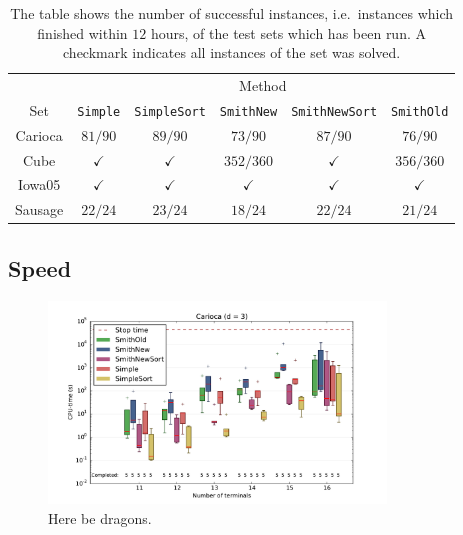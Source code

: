 \begin{table}[htbp]
  \centering
  \begin{tabular}{cccccc}
    \toprule
            & \multicolumn{5}{c}{Method}                             \\
    \cmidrule(l){2-6}
    Set     & \texttt{Simple} 
            & \texttt{SimpleSort}
            & \texttt{SmithNew} 
            & \texttt{SmithNewSort}
            & \texttt{SmithOld}                                      \\
    \cmidrule(r){1-1}\cmidrule(l){2-6}
    Carioca & $81/90$  & $89/90$  & $73/90$   & $87/90$  & $76/90$   \\
    Cube    & $\checkmark$ & $\checkmark$ & $352/360$ & $\checkmark$ & $356/360$ \\
    Iowa05  & $\checkmark$ & $\checkmark$ & $\checkmark$  & $\checkmark$ & $\checkmark$  \\
    Sausage & $22/24$  & $23/24$  & $18/24$   & $22/24$  & $21/24$   \\
    \bottomrule
  \end{tabular}
  \caption[Successfull test runs]{The table shows the number of successful
    instances, i.e.\ instances which finished within $12$ hours, of the test
    sets which has been run. A checkmark indicates all instances of the set was
    solved.\label{tab:set-success}}
\end{table}

\subsection{Speed}
\label{sec:speed}

\begin{figure}[htbp]
  \centering
  \includegraphics[width=0.8\textwidth]{gfx/boxplots/plot_nvst_boxplot_d3_Carioca_1}
  \caption[Box-plot for Carioca with $d = 3$]{Here be dragons.\label{fig:boxplot-carioca-d3}}
\end{figure}

